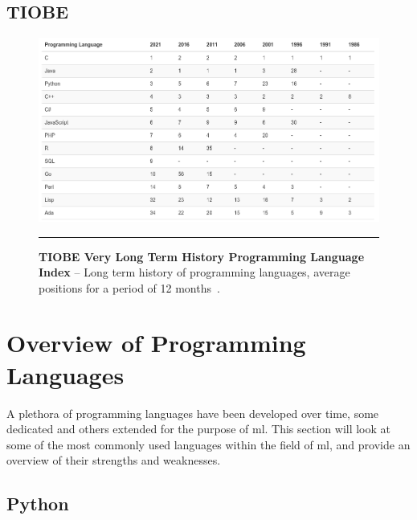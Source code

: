 \subsection{TIOBE}

\begin{figure}[H]
	\centering
        \includegraphics[width=1.0\textwidth]{media/literature/tiobe-very-long-term-history.png}
        \rule{35em}{0.5pt}
        \caption[TIOBE Programming Language Index -- Long Term History]{\textbf{TIOBE Very Long Term History Programming Language Index} -- Long term history of programming languages, average positions for a period of 12 months~\citep{tiobe}.}\label{fig:tiobe-very-long-term}
\end{figure}


\section{Overview of Programming Languages}

A plethora of programming languages have been developed over time, some dedicated and others extended for the purpose of \gls{ml}.
This section will look at some of the most 
commonly used languages within the field of \gls{ml}, and provide an overview of their strengths and weaknesses.

\subsection{Python}

